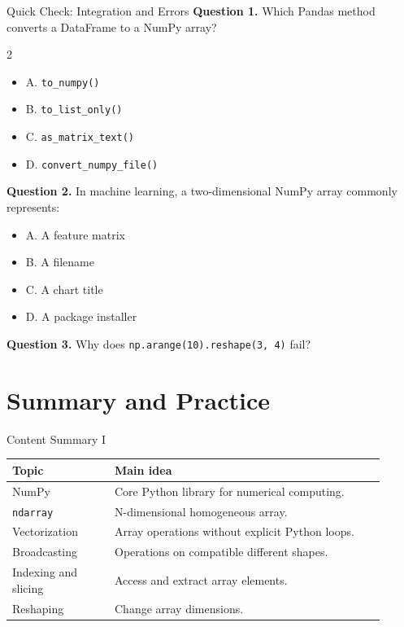 \documentclass[aspectratio=169,11pt]{beamer}
\newcommand{\quiztitle}[1]{\textbf{\textcolor{QuizOrange}{#1}}}
\begin{document}
\begin{frame}{Quick Check: Integration and Errors}
\small
\quiztitle{Question 1.} Which Pandas method converts a DataFrame to a NumPy array?
\begin{multicols}{2}
\begin{itemize}
  \item A. \texttt{to\_numpy()}
  \item B. \texttt{to\_list\_only()}
  \item C. \texttt{as\_matrix\_text()}
  \item D. \texttt{convert\_numpy\_file()}
\end{itemize}
\end{multicols}
\quiztitle{Question 2.} In machine learning, a two-dimensional NumPy array commonly represents:
\begin{itemize}
  \item A. A feature matrix
  \item B. A filename
  \item C. A chart title
  \item D. A package installer
\end{itemize}
\quiztitle{Question 3.} Why does \texttt{np.arange(10).reshape(3, 4)} fail?
\end{frame}

\section{Summary and Practice}

\begin{frame}{Content Summary I}
\small
\begin{tabular}{p{0.25\linewidth}p{0.66\linewidth}}
\toprule
\textbf{Topic} & \textbf{Main idea} \\
\midrule
NumPy & Core Python library for numerical computing. \\
\texttt{ndarray} & N-dimensional homogeneous array. \\
Vectorization & Array operations without explicit Python loops. \\
Broadcasting & Operations on compatible different shapes. \\
Indexing and slicing & Access and extract array elements. \\
Reshaping & Change array dimensions. \\
\bottomrule
\end{tabular}
\end{frame}
\end{document}

